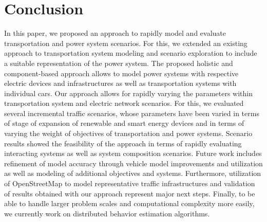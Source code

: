 \section{Conclusion}
\label{section:conclusion}

In this paper, we proposed an approach to rapidly model and evaluate transportation and power system scenarios. For this, we extended an existing approach to transportation system modeling and scenario exploration to include a suitable representation of the power system. The proposed holistic and component-based approach allows to model power systems with respective electric devices and infrastructures as well as transportation systems with individual cars. Our approach allows for rapidly varying the parameters within transportation system and electric network scenarios. For this, we evaluated several incremental traffic scenarios, whose parameters have been varied in terms of stage of expansion of renewable and smart energy devices and in terms of varying the weight of objectives of transportation and power systems. Scenario results showed the feasibility of the approach in terms of rapidly evaluating interacting systems as well as system composition scenarios. Future work includes refinement of model accuracy through vehicle model improvements and utilization as well as modeling of additional objectives and systems. Furthermore, utilization of OpenStreetMap to model representative traffic infrastructures and validation of results obtained with our approach represent major next steps. Finally, to be able to handle larger problem scales and computational complexity more easily, we currently work on distributed behavior estimation algorithms.